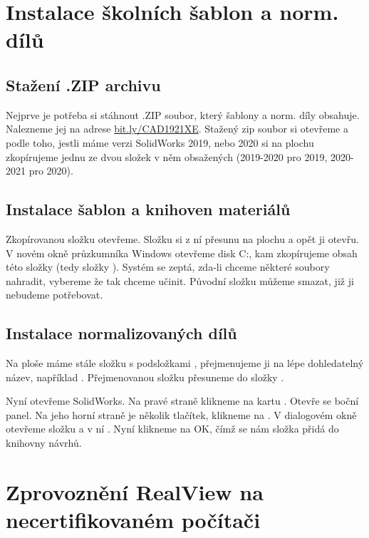 \section{Instalace školních šablon a norm. dílů}

\subsection*{Stažení .ZIP archivu}
Nejprve je potřeba si stáhnout .ZIP soubor, který šablony a norm. díly obsahuje.
Nalezneme jej na adrese \href{https://bit.ly/CAD1921XE}{bit.ly/CAD1921XE}.
Stažený zip soubor si otevřeme a podle toho, jestli máme verzi SolidWorks 2019, nebo 2020 si na plochu zkopírujeme jednu ze dvou složek v něm obsažených (2019-2020 pro 2019, 2020-2021 pro 2020).

\subsection*{Instalace šablon a knihoven materiálů}
Zkopírovanou složku otevřeme.
Složku  si z ní přesunu na plochu a opět ji otevřu.
V novém okně průzkumníka Windows otevřeme disk C:, kam zkopírujeme obsah této složky (tedy složky ).
Systém se zeptá, zda-li chceme některé soubory nahradit, vybereme že tak chceme učinit.
Původní složku  můžeme smazat, již ji nebudeme potřebovat.

\subsection*{Instalace normalizovaných dílů}
Na ploše máme stále složku s podsložkami , přejmenujeme ji na lépe dohledatelný název, například .
Přejmenovanou složku přesuneme do složky .

\noindent Nyní otevřeme SolidWorks.
Na pravé straně klikneme na kartu .
Otevře se boční panel.
Na jeho horní straně je několik tlačítek, klikneme na .
V dialogovém okně otevřeme složku  a v ní .
Nyní klikneme na OK, čímž se nám složka přidá do knihovny návrhů.

\section{Zprovoznění RealView na necertifikovaném počítači}
